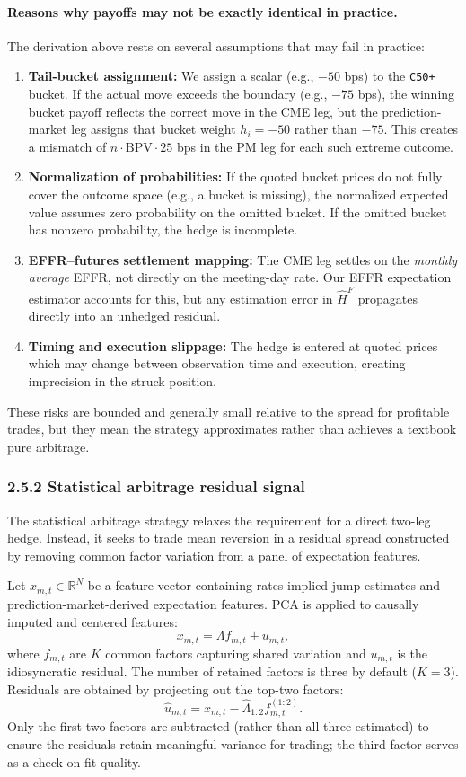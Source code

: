 \paragraph{Reasons why payoffs may not be exactly identical in practice.}
The derivation above rests on several assumptions that may fail in practice:
\begin{enumerate}
    \item \textbf{Tail-bucket assignment:} We assign a scalar (e.g., $-50$ bps) to the \texttt{C50+} bucket. If the actual move exceeds the boundary (e.g., $-75$ bps), the winning bucket payoff reflects the correct move in the CME leg, but the prediction-market leg assigns that bucket weight $h_i = -50$ rather than $-75$. This creates a mismatch of $n \cdot \text{BPV} \cdot 25$ bps in the PM leg for each such extreme outcome.
    \item \textbf{Normalization of probabilities:} If the quoted bucket prices do not fully cover the outcome space (e.g., a bucket is missing), the normalized expected value assumes zero probability on the omitted bucket. If the omitted bucket has nonzero probability, the hedge is incomplete.
    \item \textbf{EFFR--futures settlement mapping:} The CME leg settles on the \emph{monthly average} EFFR, not directly on the meeting-day rate. Our EFFR expectation estimator accounts for this, but any estimation error in $\widehat{H}^F$ propagates directly into an unhedged residual.
    \item \textbf{Timing and execution slippage:} The hedge is entered at quoted prices which may change between observation time and execution, creating imprecision in the struck position.
\end{enumerate}
These risks are bounded and generally small relative to the spread for profitable trades, but they mean the strategy approximates rather than achieves a textbook pure arbitrage.

\subsubsection*{2.5.2 Statistical arbitrage residual signal}

The statistical arbitrage strategy relaxes the requirement for a direct two-leg hedge. Instead, it seeks to trade mean reversion in a residual spread constructed by removing common factor variation from a panel of expectation features.

Let $x_{m,t} \in \mathbb{R}^N$ be a feature vector containing rates-implied jump estimates and prediction-market-derived expectation features. PCA is applied to causally imputed and centered features:
\[
x_{m,t} = \Lambda f_{m,t} + u_{m,t},
\]
where $f_{m,t}$ are $K$ common factors capturing shared variation and $u_{m,t}$ is the idiosyncratic residual. The number of retained factors is three by default ($K=3$). Residuals are obtained by projecting out the top-two factors:
\[
\hat{u}_{m,t} = x_{m,t} - \hat{\Lambda}_{1:2} f_{m,t}^{(1:2)}.
\]
Only the first two factors are subtracted (rather than all three estimated) to ensure the residuals retain meaningful variance for trading; the third factor serves as a check on fit quality.

